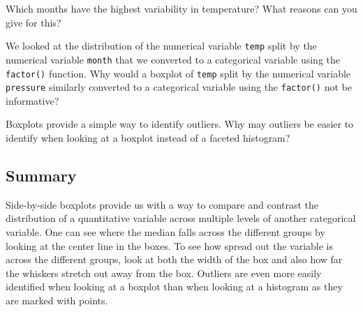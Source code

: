 \documentclass[
  letterpaper,
  DIV=11,
  numbers=noendperiod]{scrreprt}
\theoremstyle{definition}
\theoremstyle{remark}
\begin{document}
\begin{tcolorbox}[enhanced jigsaw, coltitle=black, toprule=.15mm, bottomtitle=1mm, breakable, leftrule=.75mm, title={{🎯} Learning Check 2.23}, opacitybacktitle=0.6, colback=white, rightrule=.15mm, opacityback=0, toptitle=1mm, colbacktitle=quarto-callout-tip-color!10!white, colframe=quarto-callout-tip-color-frame, titlerule=0mm, arc=.35mm, bottomrule=.15mm, left=2mm]
Which months have the highest variability in temperature? What reasons
can you give for this?
\end{tcolorbox}

\begin{tcolorbox}[enhanced jigsaw, coltitle=black, toprule=.15mm, bottomtitle=1mm, breakable, leftrule=.75mm, title={{🎯} Learning Check 2.24}, opacitybacktitle=0.6, colback=white, rightrule=.15mm, opacityback=0, toptitle=1mm, colbacktitle=quarto-callout-tip-color!10!white, colframe=quarto-callout-tip-color-frame, titlerule=0mm, arc=.35mm, bottomrule=.15mm, left=2mm]
We looked at the distribution of the numerical variable \texttt{temp}
split by the numerical variable \texttt{month} that we converted to a
categorical variable using the \texttt{factor()} function. Why would a
boxplot of \texttt{temp} split by the numerical variable
\texttt{pressure} similarly converted to a categorical variable using
the \texttt{factor()} not be informative?
\end{tcolorbox}

\begin{tcolorbox}[enhanced jigsaw, coltitle=black, toprule=.15mm, bottomtitle=1mm, breakable, leftrule=.75mm, title={{🎯} Learning Check 2.25}, opacitybacktitle=0.6, colback=white, rightrule=.15mm, opacityback=0, toptitle=1mm, colbacktitle=quarto-callout-tip-color!10!white, colframe=quarto-callout-tip-color-frame, titlerule=0mm, arc=.35mm, bottomrule=.15mm, left=2mm]
Boxplots provide a simple way to identify outliers. Why may outliers be
easier to identify when looking at a boxplot instead of a faceted
histogram?
\end{tcolorbox}

\hypertarget{summary-3}{%
\subsection{Summary}\label{summary-3}}

Side-by-side boxplots provide us with a way to compare and contrast the
distribution of a quantitative variable across multiple levels of
another categorical variable. One can see where the median falls across
the different groups by looking at the center line in the boxes. To see
how spread out the variable is across the different groups, look at both
the width of the box and also how far the whiskers stretch out away from
the box. Outliers are even more easily identified when looking at a
boxplot than when looking at a histogram as they are marked with points.
\end{document}
